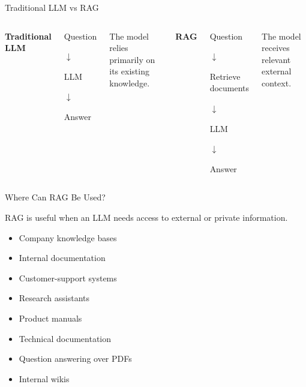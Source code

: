 \documentclass[aspectratio=169]{beamer}
\begin{document}
\begin{frame}{Traditional LLM vs RAG}

\begin{columns}


\textbf{Traditional LLM}

\begin{center}
Question

$\downarrow$

LLM

$\downarrow$

Answer
\end{center}

The model relies primarily on
its existing knowledge.

\pause 


\textbf{RAG}

\begin{center}
Question

$\downarrow$

Retrieve documents

$\downarrow$

LLM

$\downarrow$

Answer
\end{center}

The model receives relevant
external context.

\end{columns}

\end{frame}

\begin{frame}{Where Can RAG Be Used?}

RAG is useful when an LLM needs access to
external or private information.

\begin{itemize}
    \item Company knowledge bases
    \item Internal documentation
    \item Customer-support systems
    \item Research assistants
    \item Product manuals
    \item Technical documentation
    \item Question answering over PDFs
    \item Internal wikis
\end{itemize}

\end{frame}
\end{document}
